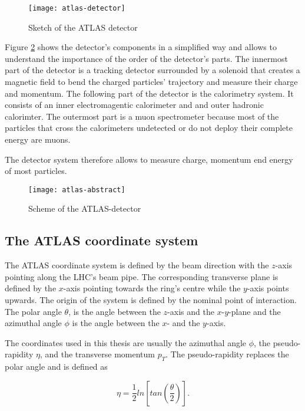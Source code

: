 \begin{figure}[h]
  \centering
  \texttt{[image: atlas-detector]}
  \caption[Sketch of the ATLAS detector]{Sketch of the ATLAS detector \cite{atlasfigures}}
  \label{fig:atlas}
\end{figure}

Figure \ref{fig:atlas_sketch} shows the detector's components in a simplified way and allows to understand the importance of the order of the detector's parts. The innermost part of the detector is a tracking detector surrounded by a solenoid that creates a magnetic field to bend the charged particles' trajectory and measure their charge and momentum.
The following part of the detector is the calorimetry system. It consists of an inner electromagentic calorimeter and and outer hadronic calorimter. The outermost part is a muon spectrometer because most of the particles that cross the calorimeters undetected or do not deploy their complete energy are muons.

The detector system therefore allows to measure charge, momentum end energy of most particles.


\begin{figure}[h]
  \centering
  \texttt{[image: atlas-abstract]}
  \caption[Sketch of the transversal section of the ATLAS detector]{Scheme of the ATLAS-detector \cite{atlasfigures}}
  \label{fig:atlas_sketch}
\end{figure}

\subsection{The ATLAS coordinate system}

The ATLAS coordinate system is defined by the beam direction with the $z$-axis pointing along the LHC's beam pipe. The corresponding transverse plane is defined by the $x$-axis pointing towards the ring's centre while the $y$-axis points upwards. The origin of the system is defined by the nominal point of interaction. The polar angle $\theta$, is the angle between the $z$-axis and the $x$-$y$-plane and the azimuthal angle $\phi$ is the angle between the $x$- and the $y$-axis.

The coordinates used in this thesis are usually the azimuthal angle $\phi$, the pseudo-rapidity $\eta$, and the transverse momentum $p_T$. The pseudo-rapidity replaces the polar angle and is defined as

\begin{equation}
\eta = \frac{1}{2} ln\left[ tan\left(\frac{\theta}{2}\right)\right].
\end{equation}

